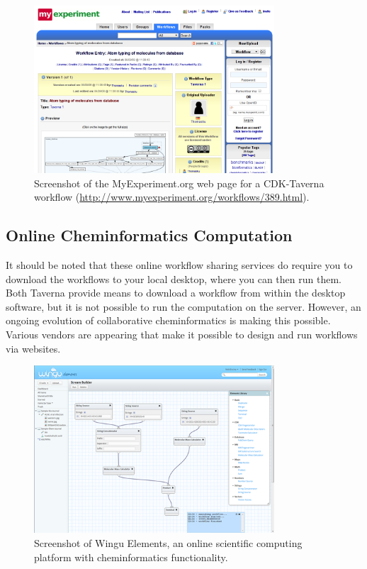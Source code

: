 \documentclass[11pt]{book}
\begin{document}
\begin{figure}[bt]
\begin{center}
\includegraphics[width=0.8\textwidth]{graphics/myexperiment.png}
\end{center}
\caption{Screenshot of the MyExperiment.org web page for a
CDK-Taverna workflow (\url{http://www.myexperiment.org/workflows/389.html}).}
\label{fig:myexperiment}
\end{figure}

\subsection{Online Cheminformatics Computation}

It should be noted that these online workflow sharing services do
require you to download the workflows to your local desktop, where
you can then run them. Both Taverna provide means to download a
workflow from within the desktop software, but it is not possible
to run the computation on the server.
However, an ongoing evolution of collaborative cheminformatics
is making this possible. Various vendors are appearing that make
it possible to design and run workflows via websites.

\begin{figure}[bt]
\begin{center}
\includegraphics[width=0.8\textwidth]{graphics/wingu.png}
\end{center}
\caption{Screenshot of Wingu Elements, an online scientific
computing platform with cheminformatics functionality.}
\label{fig:wingu}
\end{figure}
\end{document}

